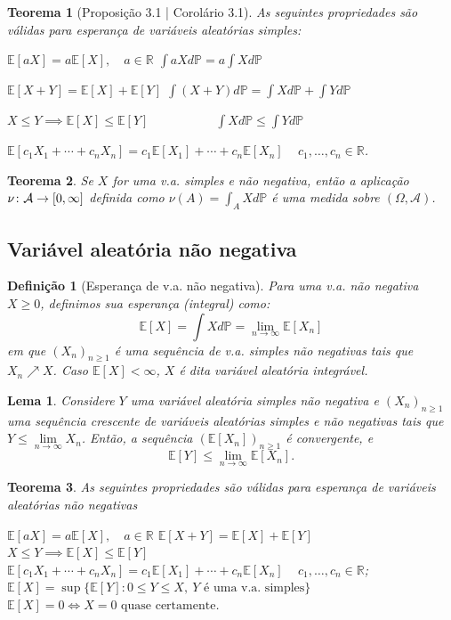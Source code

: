 \documentclass[12pt,a4paper,answers]{article}
\numberwithin{equation}{section} %
\renewcommand{\Re}{\mathbb{R}}
\renewcommand{\P}{\mathbb{P}}
\newcommand{\E}{\mathbb{E}}
\newcommand{\Acal}{\mathcal{A}}
\theoremstyle{thm_estilo}
\newtheorem{theorem}{Teorema}[section]
\newtheorem{definition}{Definição}[section]
\newtheorem{lemma}{Lema}[section]
\theoremstyle{thm_note_est}
\begin{document}
\begin{theorem}[Proposição 3.1 | Corolário 3.1]
	As seguintes propriedades são válidas para esperança de variáveis aleatórias simples:
	\begin{outline}[enumerate]
		\1 \(\E[aX] = a\E[X], \quad a\in \Re\)
		\1[] \(\int aX d\P = a \int X d\P\)
		
		\1 \(\E[X+Y] = \E[X] + \E[Y]\)
		\1[] \(\int (X+Y) d\P = \int X d\P + \int Y d\P\)
		
		\1 \(X\leq Y \implies \E[X]\leq\E[Y]\)
		\1[] \(\quad\quad\quad\quad\quad \int X d\P \leq \int Y d\P\)
		
		\1 \(\E[c_1X_1 + \cdots + c_n X_n] = c_1\E[X_1] + \cdots + c_n\E[X_n]\, \quad c_1,\ldots,c_n\in\Re\).
	\end{outline}
\end{theorem}


\begin{theorem}
	Se $X$ for uma v.a. simples e não negativa, então a aplicação \(\mathmbox{\nu\colon \Acal \to [0, \infty]}\) definida como \(\nu(A) = \int_A X d\P\) é uma medida sobre $(\Omega, \Acal)$.
\end{theorem}

\subsection{Variável aleatória não negativa}

\begin{definition}[Esperança de v.a. não negativa]
	Para uma v.a. não negativa $X\geq0$, definimos sua esperança (integral) como:
	\begin{equation}
		\E[X] = \int X d\P = \lim\limits_{n\to\infty}\E[X_n]
	\end{equation}
	em que $(X_n)_{n\geq1}$ é uma sequência de v.a. simples não negativas tais que \(X_n\nearrow X\). Caso \(\E[X]<\infty\), $X$ é dita \textit{variável aleatória integrável}.
\end{definition}

\begin{lemma}
	Considere $Y$ uma variável aleatória simples não negativa e $(X_n)_{n\geq1}$ uma sequência crescente de variáveis aleatórias simples e não negativas tais que $Y\leq \lim\limits_{n\to\infty}X_n$. Então, a sequência $(\E[X_n])_{n\geq1}$ é convergente, e
	\[
		\E[Y] \leq \lim\limits_{n\to\infty}\E[X_n].
	\]
\end{lemma}

\begin{theorem}
	As seguintes propriedades são válidas para esperança de variáveis aleatórias não negativas
	\begin{outline}[enumerate]
		\1 \(\E[aX] = a\E[X], \quad a\in \Re\)
		\1 \(\E[X+Y] = \E[X] + \E[Y]\)
		\1 \(X\leq Y \implies \E[X]\leq\E[Y]\)
		\1 \(\E[c_1X_1 + \cdots + c_n X_n] = c_1\E[X_1] + \cdots + c_n\E[X_n]\, \quad c_1,\ldots,c_n\in\Re\);
		\1 \(\E[X] = \sup\{\E[Y]: 0 \leq Y \leq X, \ Y \text{ é uma v.a. simples} \}\)
		\1 \( \E[X] = 0 \iff X=0 \text{ quase certamente}\).
	\end{outline}
\end{theorem}
\end{document}
